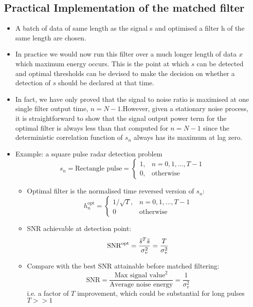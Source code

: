\documentclass[12pt]{article}
\newcommand{\sigd}{\sigma^2}
\newcommand{\opt}{\textrm{opt}}
\begin{document}
\subsection{Practical Implementation of the matched filter}
\begin{itemize}
    \item A batch of data of same length as the signal s and optimised a filter h of the same length are chosen.
    \item In practice we would now run this filter over a much longer length of data $x$ which maximum energy occurs. This is the point at which $s$ can be detected and optimal thresholds can be devised to make the decision on whether a detection of $s$ should be declared at that time.
    \item In fact, we have only proved that the signal to noise ratio is maximised at one single filter output time, $n = N-1$.However, given a stationary noise process, it is straightforward to show that the signal output power term for the optimal filter is always less than that computed for $n=N-1$ since the deterministic correlation function of $s_n$ always has its maximum at lag zero.
    \item Example:  a square pulse radar detection problem
    \[
    s_n = \textrm{Rectangle pulse} = \left \{
    \begin{array}{ll}
        1, & n=0,1,...,T-1 \\
        0, & \textrm{otherwise}
    \end{array}\right.
    \]
    \begin{itemize}
        \item Optimal filter is the normalised time reversed version of $s_n$:
        \[
        h_n^{\opt} = \left\{ \begin{array}{ll}
            1/\sqrt{T}, & n=0,1,...,T-1 \\
            0 & \textrm{otherwise}
        \end{array}\right.
        \]
        \item SNR achievable at detection point:
        \[
        \textrm{SNR}^\opt = \frac{\Tilde{s}^T\Tilde{s}}{\sigd_v} = \frac{T}{\sigd_v}
        \]
        \item Compare with the best SNR attainable before matched filtering:
        \[
        \textrm{SNR}= \frac{\textrm{Max signal value}^2}{\textrm{Average noise energy}} =\frac{1}{\sigd_v}
        \]
        i.e. a factor of $T$ improvement, which could be substantial for long pulses $T >>1$ 
        \begin{figure}[H]

\end{figure}
\end{itemize}
\end{itemize}
\end{document}
